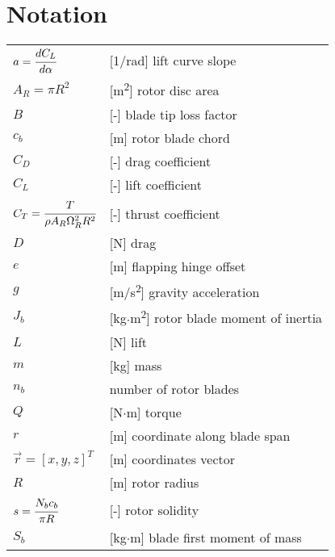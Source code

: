 \clearpage %
{}
\chapter*{Notation}
\markright{}

\begin{longtable}[l]{ l p{} }
  $a=\cfrac{dC_L}{d \alpha}$                 & [1/rad] lift curve slope \\
  $A_R=\pi R^2$                              & [m\textsuperscript{2}] rotor disc area \\
  $B$                                        & [-] blade tip loss factor \\
  $c_b$                                      & [m] rotor blade chord \\
  $C_D$                                      & [-] drag coefficient \\
  $C_L$                                      & [-] lift coefficient \\
  $C_T=\cfrac{T}{\rho A_R \Omega_R^2 R^2}$   & [-] thrust coefficient \\
  $D$                                        & [N] drag \\
  $e$                                        & [m] flapping hinge offset \\
  $g$                                        & [m/s\textsuperscript{2}] gravity acceleration \\
  $J_b$                                      & [kg$\cdot$m\textsuperscript{2}] rotor blade moment of inertia \\
  $L$                                        & [N] lift \\
  $m$                                        & [kg] mass \\
  $n_b$                                      & number of rotor blades \\
  $Q$                                        & [N$\cdot$m] torque \\
  $r$                                        & [m] coordinate along blade span \\
  $\vec r=\left[ x, y, z \right]^T$          & [m] coordinates vector \\
  $R$                                        & [m] rotor radius \\
  $s=\cfrac{N_b c_b}{\pi R}$                 & [-] rotor solidity \\
  $S_b$                                      & [kg$\cdot$m] blade first moment of mass \\

\end{longtable}

